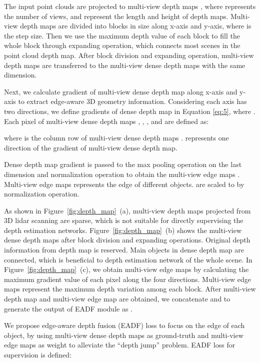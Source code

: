 \documentclass[letterpaper]{article} \usepackage[submission]{aaai24}  \usepackage{times}  \usepackage{helvet}  \usepackage{courier}  \usepackage[hyphens]{url}  \usepackage{graphicx} \urlstyle{rm} \def\UrlFont{\rm}  \usepackage{natbib}  \usepackage{caption} \frenchspacing  \setlength{\pdfpagewidth}{8.5in} \setlength{\pdfpageheight}{11in} \usepackage{algorithm}
\begin{document}
The input point clouds are projected to multi-view depth maps , where  represents the number of views,  and  represent the length and height of depth maps. 
Multi-view depth maps  are divided into blocks in size  along x-axis and y-axis, where  is the step size. Then we use the maximum depth value of each block to fill the whole block through expanding operation, which connects most scenes in the point cloud depth map. After block division and expanding operation,  multi-view depth maps  are transferred to the multi-view dense depth maps  with the same dimension.

Next, we calculate gradient of multi-view dense depth map along x-axis and y-axis to extract edge-aware 3D geometry information. Considering each axis has two directions, we define gradients of dense depth map  in Equation \ref{eq:5}, where . Each pixel of multi-view dense depth maps , , , and  are defined as:

where  is the  column  row of  multi-view dense depth maps .  represents one direction of the gradient of multi-view dense depth map.

Dense depth map gradient  is passed to the max pooling operation on the last dimension and normalization operation to obtain the multi-view edge maps . 
Multi-view edge maps  represents the edge of different objects.  are scaled to  by normalization operation. 



As shown in Figure~\ref{fig:depth_map}~(a), multi-view depth maps  projected from 3D lidar scanning are sparse, which is not suitable for directly supervising the depth estimation networks. Figure~\ref{fig:depth_map}~(b) shows the multi-view dense depth maps  after block division and expanding operations. Original depth information from depth map is reserved. Main objects in dense depth map are connected, which is beneficial to depth estimation network of the whole scene. In Figure~\ref{fig:depth_map}~(c), we obtain multi-view edge maps  by calculating the maximum gradient value of each pixel along the four directions. Multi-view edge maps  represent the maximum depth variation among each block. 
After multi-view depth map  and multi-view edge map  are obtained, we concatenate  and  to generate the output of EADF module as .

We propose edge-aware depth fusion (EADF) loss to focus on the edge of each object, by using multi-view dense depth maps  as ground-truth and multi-view edge maps  as weight to alleviate the ``depth jump'' problem. EADF
 loss  for supervision is defined:
\end{document}
